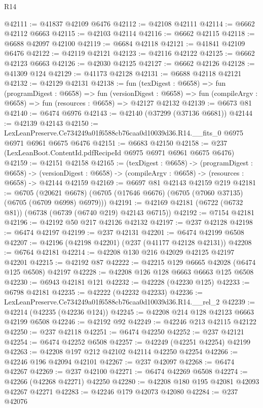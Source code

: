 \begin{lexlean}{R14}
\begin{coremodule}
@42111 := @41837 @42109 @6476
@42112 := @42108 @42111
@42114 := @6662 @42112 @6663
@42115 := @42103 @42114
@42116 := @6662 @42115
@42118 := @6688 @42097 @42100
@42119 := @6684 @42118
@42121 := @41841 @42109 @6476
@42122 := @42119 @42121
@42123 := @42116 @42122
@42125 := @6662 @42123 @6663
@42126 := @42030 @42125
@42127 := @6662 @42126
@42128 := @41309 @124
@42129 := @41173 @42128
@42131 := @6688 @42118 @42121
@42132 := @42129 @42131
@42138 := fun (texDigest : @6658) =>
  fun (programDigest : @6658) =>
  fun (versionDigest : @6658) =>
  fun (compileArgv : @6658) => fun (resources : @6658) => @42127 @42132
@42139 := @6673 @81
@42140 := @6474 @6976
@42143 := @42140 (@37299 (@37136 @6681))
@42144 := @42139 @42143
@42150 := LexLeanPreserve.Ce734249a01f6588cb76caa0d10039d36.R14.__fits_0
    @6975
    @6971
    @6961
    @6675
    @6476
@42151 := @6683 @42150
@42158 := @237 (LexLeanBoot.ContentId.pdfRecipeId @6975 @6971 @6961 @6675 @6476)
@42159 := @42151 @42158
@42165 := (texDigest : @6658) ->
  (programDigest : @6658) ->
  (versionDigest : @6658) -> (compileArgv : @6658) -> (resources : @6658) -> @42144 @42159
@42169 := @6697 @81 @42143 @42159 @219
@42181 := @6705
    (@20621 @6678)
    (@6705 (@17646 @6676) (@6705 (@7060 @37135) (@6705 (@6709 @6998) @6979)))
@42191 := @42169 @42181 (@6722 (@6732 @81)) (@6738 (@6739 (@6740 @219) @42143 @6715))
@42192 := @7154 @42181
@42196 := @42192 @50 @217 @42126 @42132
@42197 := @237 @42128
@42198 := @6474 @42197
@42199 := @237 @42131
@42201 := @6474 @42199 @6508
@42207 := @42196 (@42198 @42201) (@237 (@41177 @42128 @42131))
@42208 := @6764 @42181
@42214 := @42208 @130 @216 @42029 @42125 @42197 @42201
@42215 := @42192 @87
@42222 := @42215 @129 @6665 @42028 (@6474 @125 @6508) @42197
@42228 := @42208 @126 @128 @6663 @6663 @125 @6508
@42230 := @6943 @42181 @121
@42232 := @42228 (@42230 @125)
@42233 := @6798 @42181
@42235 := @42222 (@42232 @42233)
@42236 := LexLeanPreserve.Ce734249a01f6588cb76caa0d10039d36.R14.__rel_2
@42239 := @42214 (@42235 (@42236 @124))
@42245 := @42208 @214 @128 @42123 @6663 @42199 @6508
@42246 := @42192 @92
@42249 := @42246 @213 @42115 @42122
@42250 := @237 @42118
@42251 := @6474 @42250
@42252 := @237 @42121
@42254 := @6474 @42252 @6508
@42257 := @42249 (@42251 @42254) @42199
@42263 := @42208 @197 @212 @42102 @42114 @42250 @42254
@42266 := @42246 @196 @42094 @42101
@42267 := @237 @42097
@42268 := @6474 @42267
@42269 := @237 @42100
@42271 := @6474 @42269 @6508
@42274 := @42266 (@42268 @42271) @42250
@42280 := @42208 @180 @195 @42081 @42093 @42267 @42271
@42283 := @42246 @179 @42073 @42080
@42284 := @237 @42076

\end{coremodule}
\end{lexlean}
